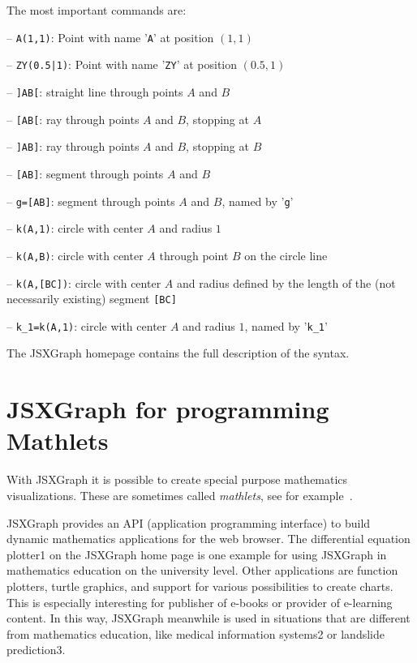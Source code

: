 \documentclass[12pt,a4paper]{article}%
\begin{document}
The most important commands are:
\begin{description}
\item{-- \verb+A(1,1)+:} Point with name '\verb|A|' at position $(1,1)$
\item{-- \verb+ZY(0.5|1)+:} Point with name '\verb|ZY|' at position $(0.5,1)$
\item{-- \verb|]AB[|:} straight line through points $A$ and $B$
\item{-- \verb|[AB[|:} ray through points $A$ and $B$, stopping at $A$
\item{-- \verb|]AB]|:} ray through points $A$ and $B$, stopping at $B$
\item{-- \verb|[AB]|:} segment through points $A$ and $B$
\item{-- \verb|g=[AB]|:} segment through points $A$ and $B$, named by '\verb|g|'
\item{-- \verb|k(A,1)|:} circle with center $A$ and radius $1$
\item{-- \verb|k(A,B)|:} circle with center $A$ through point $B$ on the circle line
\item{-- \verb|k(A,[BC])|:} circle with center $A$ and radius defined by the length of the 
(not necessarily existing) segment \verb|[BC]|
\item{-- \verb|k_1=k(A,1)|:} circle with center $A$ and radius $1$, named by '\verb|k_1|' 
\end{description}

The JSXGraph homepage contains the full description of the syntax.


\section{JSXGraph for programming Mathlets}
With JSXGraph it is possible to create special purpose mathematics visualizations.
These are sometimes called {\sl mathlets}, see for example~\cite{mitmathlets}.

JSXGraph provides an API (application programming interface) to build dynamic 
mathematics applications for the web browser. The differential equation plotter1 
on the JSXGraph home page is one example for using JSXGraph in mathematics 
education on the university level. Other applications are function plotters, 
turtle graphics, and support for various possibilities to create charts. 
This is especially interesting for publisher of e-books or provider of e-learning 
content. In this way, JSXGraph meanwhile is used in situations that are different 
from mathematics education, like medical information systems2 or landslide prediction3. 
\end{document}
